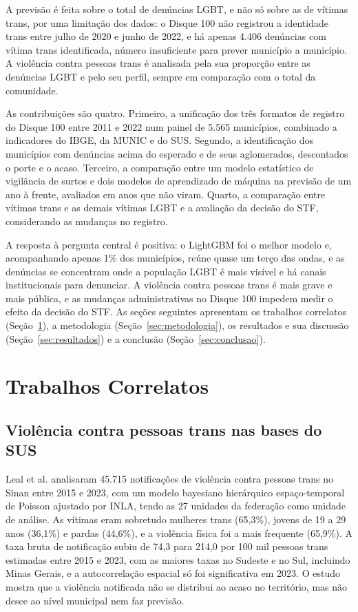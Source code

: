 \documentclass[12pt]{article}
\begin{document}
A previsão é feita sobre o total de denúncias LGBT, e não só sobre as de vítimas trans, por uma limitação dos dados: o Disque 100 não registrou a identidade trans entre julho de 2020 e junho de 2022, e há apenas 4.406 denúncias com vítima trans identificada, número insuficiente para prever município a município. A violência contra pessoas trans é analisada pela sua proporção entre as denúncias LGBT e pelo seu perfil, sempre em comparação com o total da comunidade.

As contribuições são quatro. Primeiro, a unificação dos três formatos de registro do Disque 100 entre 2011 e 2022 num painel de 5.565 municípios, combinado a indicadores do IBGE, da MUNIC e do SUS. Segundo, a identificação dos municípios com denúncias acima do esperado e de seus aglomerados, descontados o porte e o acaso. Terceiro, a comparação entre um modelo estatístico de vigilância de surtos e dois modelos de aprendizado de máquina na previsão de um ano à frente, avaliados em anos que não viram. Quarto, a comparação entre vítimas trans e as demais vítimas LGBT e a avaliação da decisão do STF, considerando as mudanças no registro.

A resposta à pergunta central é positiva: o LightGBM foi o melhor modelo e, acompanhando apenas 1\% dos municípios, reúne quase um terço das ondas, e as denúncias se concentram onde a população LGBT é mais visível e há canais institucionais para denunciar. A violência contra pessoas trans é mais grave e mais pública, e as mudanças administrativas no Disque 100 impedem medir o efeito da decisão do STF. As seções seguintes apresentam os trabalhos correlatos (Seção~\ref{sec:correlatos}), a metodologia (Seção~\ref{sec:metodologia}), os resultados e sua discussão (Seção~\ref{sec:resultados}) e a conclusão (Seção~\ref{sec:conclusao}).


\section{Trabalhos Correlatos}
\label{sec:correlatos}

\subsection{Violência contra pessoas trans nas bases do SUS}

Leal et al. \cite{leal_silva_lizzi:2026} analisaram 45.715 notificações de violência contra pessoas trans no Sinan entre 2015 e 2023, com um modelo bayesiano hierárquico espaço-temporal de Poisson ajustado por INLA, tendo as 27 unidades da federação como unidade de análise. As vítimas eram sobretudo mulheres trans (65,3\%), jovens de 19 a 29 anos (36,1\%) e pardas (44,6\%), e a violência física foi a mais frequente (65,9\%). A taxa bruta de notificação subiu de 74,3 para 214,0 por 100 mil pessoas trans estimadas entre 2015 e 2023, com as maiores taxas no Sudeste e no Sul, incluindo Minas Gerais, e a autocorrelação espacial só foi significativa em 2023. O estudo mostra que a violência notificada não se distribui ao acaso no território, mas não desce ao nível municipal nem faz previsão.
\end{document}
